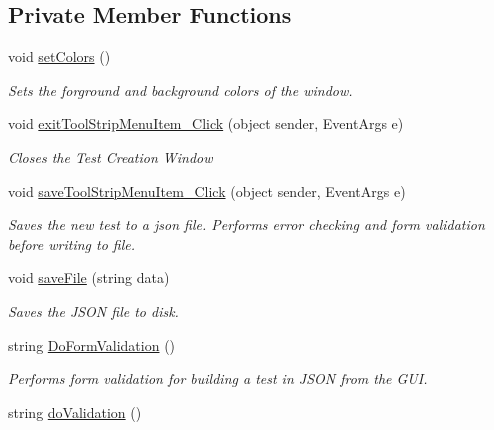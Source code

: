 \subsection*{Private Member Functions}
\begin{DoxyCompactItemize}
\item 
void \mbox{\hyperlink{class_cert_complete_1_1_test___creation___form_a802231fb90fb9973dce0e5040087e317}{set\+Colors}} ()
\begin{DoxyCompactList}\small\item\em Sets the forground and background colors of the window. \end{DoxyCompactList}\item 
void \mbox{\hyperlink{class_cert_complete_1_1_test___creation___form_ae36293720dd7819d3f788dbc06516184}{exit\+Tool\+Strip\+Menu\+Item\+\_\+\+Click}} (object sender, Event\+Args e)
\begin{DoxyCompactList}\small\item\em Closes the Test Creation Window \end{DoxyCompactList}\item 
void \mbox{\hyperlink{class_cert_complete_1_1_test___creation___form_ab6ab0ad2945f8df783030835f629aff7}{save\+Tool\+Strip\+Menu\+Item\+\_\+\+Click}} (object sender, Event\+Args e)
\begin{DoxyCompactList}\small\item\em Saves the new test to a json file. Performs error checking and form validation before writing to file. \end{DoxyCompactList}\item 
void \mbox{\hyperlink{class_cert_complete_1_1_test___creation___form_a418acddddbc9675df92727b7ee74a76c}{save\+File}} (string data)
\begin{DoxyCompactList}\small\item\em Saves the J\+S\+ON file to disk. \end{DoxyCompactList}\item 
string \mbox{\hyperlink{class_cert_complete_1_1_test___creation___form_ac92300bde2570f1e14cfefc94718f540}{Do\+Form\+Validation}} ()
\begin{DoxyCompactList}\small\item\em Performs form validation for building a test in J\+S\+ON from the G\+UI. \end{DoxyCompactList}\item 
string \mbox{\hyperlink{class_cert_complete_1_1_test___creation___form_ad6f5b44aba85d63f8a8e6c86425c2000}{do\+Validation}} ()

\end{DoxyCompactItemize}
